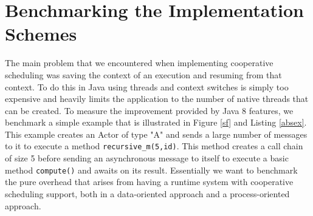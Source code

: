 \section{Benchmarking the Implementation Schemes}
\label{bench}
The main problem that we encountered  when implementing cooperative scheduling was saving the context of an execution and resuming from that context. To do this in Java using threads and context switches is simply too expensive and heavily limits the application to the number of native threads that can be created. To measure the improvement provided by Java 8 features, we benchmark a simple example that is illustrated in Figure \ref{sf} and Listing \ref{absex}. This example creates an Actor of type "A" and sends a large number of messages to it to execute a method \lstinline|recursive_m(5,id)|. This method creates a call chain of size 5 before sending an asynchronous message to itself to execute a basic method \lstinline|compute()| and awaits on its result. Essentially we want to benchmark the pure overhead that arises from having a runtime system with cooperative scheduling support, both in a data-oriented approach and a process-oriented approach.




